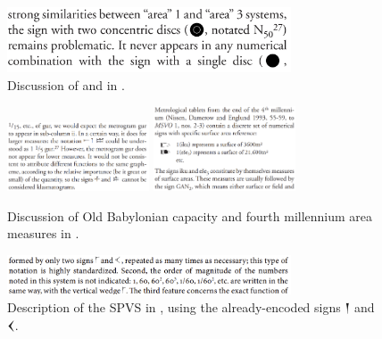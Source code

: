 \documentclass[10pt, a4paper, twoside]{article}
\newcommand\oneŊešTwoC{{\proposalfont\symbol{"1256B}}}
\newcommand\oneŊešʾuC{{\proposalfont\symbol{"12574}}}
\newcommand\oneŠarTwoC{{\proposalfont\symbol{"12579}}}
\newcommand\oneŠarʾuC{{\proposalfont\symbol{"12582}}}
\begin{document}
\begin{figure}[H]
  \begin{center}
  \includegraphics[width=0.75\textwidth]{chambon-6.png}
  \caption[]{Discussion of \oneŠarʾuC{} and \oneŠarTwoC{}\footnotemark{} in \cite[6]{Chambon2003}.\label{chambon6}}
  \end{center}
\end{figure}
\begin{figure}[H]
  \begin{center}
  \includegraphics[width=0.375\textwidth]{proust-9a.png}
  \includegraphics[width=0.375\textwidth]{proust-9.png}
  \caption[]{Discussion of Old Babylonian\footnotemark{} capacity and fourth millennium area measures in \cite[9]{Proust2009}.\label{proust9}}
  \end{center}
\end{figure}
\begin{figure}[H]
  \begin{center}
  \includegraphics[width=0.75\textwidth]{chambon-58.png}
  \caption{
    Description of the SPVS in \cite[58]{Chambon2012},
    using the already-encoded signs {\xsuxfont 𒁹} and {\xsuxfont 𒌋}.\label{chambon58}}
  \end{center}
\end{figure}
\end{document}

